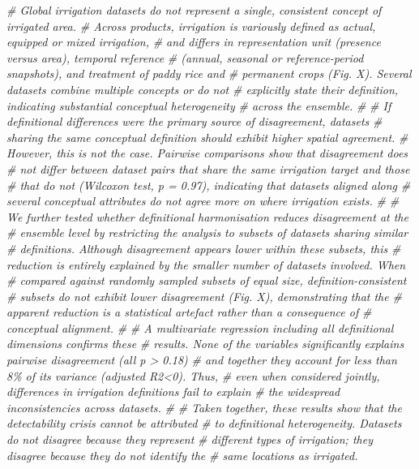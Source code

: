 \documentclass[
  11pt,
]{article}
\newenvironment{Shaded}{\begin{snugshade}}{\end{snugshade}}
\newcommand{\CommentTok}[1]{\textcolor[rgb]{0.56,0.35,0.01}{\textit{#1}}}
\begin{document}
\begin{Shaded}
\begin{Highlighting}[]
\CommentTok{\# Global irrigation datasets do not represent a single, consistent concept of irrigated area.}
\CommentTok{\# Across products, irrigation is variously defined as actual, equipped or mixed irrigation,}
\CommentTok{\# and differs in representation unit (presence versus area), temporal reference}
\CommentTok{\# (annual, seasonal or reference{-}period snapshots), and treatment of paddy rice and}
\CommentTok{\# permanent crops (Fig. X). Several datasets combine multiple concepts or do not}
\CommentTok{\# explicitly state their definition, indicating substantial conceptual heterogeneity}
\CommentTok{\# across the ensemble.}
\CommentTok{\#}
\CommentTok{\# If definitional differences were the primary source of disagreement, datasets}
\CommentTok{\# sharing the same conceptual definition should exhibit higher spatial agreement.}
\CommentTok{\# However, this is not the case. Pairwise comparisons show that disagreement does}
\CommentTok{\# not differ between dataset pairs that share the same irrigation target and those}
\CommentTok{\# that do not (Wilcoxon test, p = 0.97), indicating that datasets aligned along}
\CommentTok{\# several conceptual attributes do not agree more on where irrigation exists.}
\CommentTok{\#}
\CommentTok{\# We further tested whether definitional harmonisation reduces disagreement at the}
\CommentTok{\# ensemble level by restricting the analysis to subsets of datasets sharing similar}
\CommentTok{\# definitions. Although disagreement appears lower within these subsets, this}
\CommentTok{\# reduction is entirely explained by the smaller number of datasets involved. When}
\CommentTok{\# compared against randomly sampled subsets of equal size, definition{-}consistent}
\CommentTok{\# subsets do not exhibit lower disagreement (Fig. X), demonstrating that the}
\CommentTok{\# apparent reduction is a statistical artefact rather than a consequence of}
\CommentTok{\# conceptual alignment.}
\CommentTok{\#}
\CommentTok{\# A multivariate regression including all definitional dimensions confirms these}
\CommentTok{\# results. None of the variables significantly explains pairwise disagreement (all p \textgreater{} 0.18)}
\CommentTok{\# and together they account for less than 8\% of its variance (adjusted R2\textless{}0). Thus,}
\CommentTok{\# even when considered jointly, differences in irrigation definitions fail to explain}
\CommentTok{\# the widespread inconsistencies across datasets.}
\CommentTok{\#}
\CommentTok{\# Taken together, these results show that the detectability crisis cannot be attributed}
\CommentTok{\# to definitional heterogeneity. Datasets do not disagree because they represent}
\CommentTok{\# different types of irrigation; they disagree because they do not identify the}
\CommentTok{\# same locations as irrigated.}
\end{Highlighting}
\end{Shaded}
\end{document}
